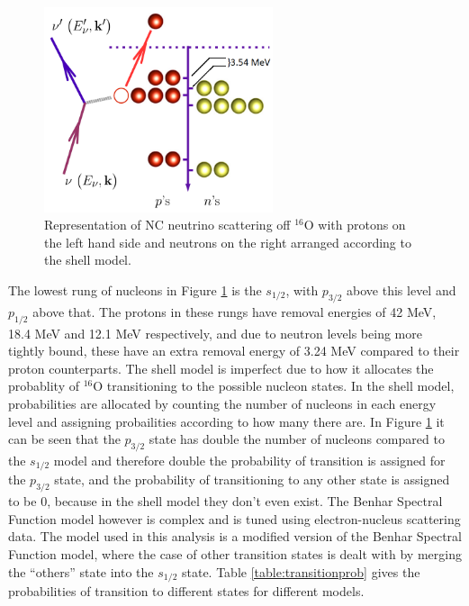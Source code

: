 \begin{figure}[htp]
    \centering
    \includegraphics[width=0.6\textwidth]{Figures/ncqebenharspectral.png}
    \caption{Representation of NC neutrino scattering off ${ }^{16} \mathrm{O}$ with protons on the left hand side and neutrons on the right arranged according to the shell model. }
\label{fig:ncqebenharspectral}
\end{figure}

The lowest rung of nucleons in Figure \ref{fig:ncqebenharspectral} is the $s_{1/2}$, with $p_{3/2}$ above this level and $p_{1/2}$ above that. The protons in these rungs have removal energies of 42 MeV, 18.4 MeV and 12.1 MeV respectively, and due to neutron levels being more tightly bound, these have an extra removal energy of 3.24 MeV compared to their proton counterparts. The shell model is imperfect due to how it allocates the probablity of ${ }^{16} \mathrm{O}$ transitioning to the possible nucleon states. In the shell model, probabilities are allocated by counting the number of nucleons in each energy level and assigning probailities according to how many there are. In Figure \ref{fig:ncqebenharspectral} it can be seen that the $p_{3/2}$ state has double the number of nucleons compared to the $s_{1/2}$ model and therefore double the probability of transition is assigned for the $p_{3/2}$ state, and the probability of transitioning to any other state is assigned to be 0, because in the shell model they don't even exist. The Benhar Spectral Function model however is complex and is tuned using electron-nucleus scattering data. The model used in this analysis is a modified version of the Benhar Spectral Function model, where the case of other transition states is dealt with by merging the ``others'' state into the $s_{1/2}$ state. Table \ref{table:transitionprob} gives the probabilities of transition to different states for different models. 

